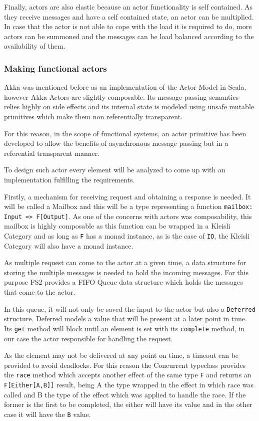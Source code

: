 \documentclass[../main.tex]{subfiles}
\begin{document}
Finally, actors are also elastic because an actor functionality is self
contained. As they receive messages and have a self contained state, an actor can be
multiplied. In case that the actor is not able to cope with the load it is
required to do, more actors can be summoned and the messages can be load balanced
according to the availability of them.

\subsubsection{Making functional actors}
Akka was mentioned before as an implementation of the Actor Model in Scala,
however Akka Actors are slightly composable. Its message passing semantics relies
highly on side effects and its internal state is modeled using unsafe mutable
primitives which make them non referentially transparent.

For this reason, in the scope of functional systems, an actor primitive has been
developed to allow the benefits of asynchronous message passing but in a
referential transparent manner.

To design such actor every element will be analyzed to come up with
an implementation fulfilling the requirements.

Firstly, a mechanism for receiving request and obtaining a
response is needed. It will be called a Mailbox and this will be a type representing a function
\lstinline{mailbox: Input => F[Output]}. As one of the concerns with actors was
composability, this mailbox is highly composable as this function can be wrapped
in a Kleisli Category and as long as \texttt{F} has a monad instance, as is the case of
\texttt{IO}, the Kleisli Category will also have a monad instance.

As multiple request can come to the actor at a given time, a data structure for
storing the multiple messages is needed to hold the incoming messages. For this
purpose FS2 provides a FIFO Queue data structure which holds the messages that
come to the actor.

In this queue, it will not only be saved the input to the actor but also a
\texttt{Deferred} structure. Deferred models a value that will be present at a
later point in time. Its \texttt{get} method will block until an element is set
with its \texttt{complete} method, in our case the actor responsible for
handling the request.

As the element may not be delivered at any point on time,
a timeout can be provided to avoid deadlocks. For this reason the Concurrent
typeclass provides the \texttt{race} method which accepts another effect of the same type
\texttt{F} and returns an \texttt{F[Either[A,B]]} result, being A the type
wrapped in the effect in which race was called and B the type of the effect
which was applied to handle the race. If the former is the first to be completed, the
either will have its value and in the other case it will have the \texttt{B}
value.
\end{document}
